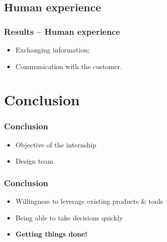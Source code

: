 \documentclass{beamer}
\begin{document}
\subsection{Human experience}

\begin{frame}\frametitle{Results -- Human experience}
\begin{itemize}
\item Exchanging information;
\item Communication with the customer.
\end{itemize}
\end{frame}

\section{Conclusion}

\begin{frame}\frametitle{Conclusion}
\begin{itemize}
\item Objective of the internship
\item Design team
\end{itemize}
\end{frame}

\begin{frame}\frametitle{Conclusion}
\begin{itemize}
\item Willingness to leverage existing products \& tools
\item Being able to take decisions quickly
\item \textbf{Getting things done!}
\end{itemize}
\end{frame}
\end{document}

